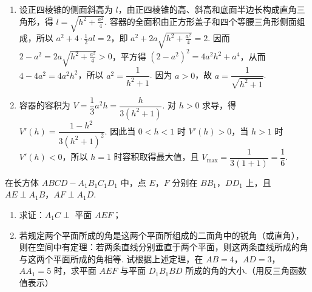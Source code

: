 \begin{solution}
\begin{enumerate}
\item 设正四棱锥的侧面斜高为 \(l\)，由正四棱锥的高、斜高和底面半边长构成直角三角形，得 \(l=\sqrt{h^{2}+\frac{a^{2}}{4}}\). 容器的全面积由正方形盖子和四个等腰三角形侧面组成，所以 \(a^{2}+4\cdot\frac{1}{2}al=2\)，即 \(a^{2}+2a\sqrt{h^{2}+\frac{a^{2}}{4}}=2\). 因而 \(2-a^{2}=2a\sqrt{h^{2}+\frac{a^{2}}{4}}>0\)，平方得 \((2-a^{2})^{2}=4a^{2}h^{2}+a^{4}\)，从而 \(4-4a^{2}=4a^{2}h^{2}\)，所以 \(a^{2}=\dfrac{1}{h^{2}+1}\). 因为 \(a>0\)，故 \(a=\dfrac{1}{\sqrt{h^{2}+1}}\).
\item 容器的容积为 \(V=\dfrac{1}{3}a^{2}h=\dfrac{h}{3(h^{2}+1)}\). 对 \(h>0\) 求导，得 \(V'(h)=\dfrac{1-h^{2}}{3(h^{2}+1)^{2}}\). 因此当 \(0<h<1\) 时 \(V'(h)>0\)，当 \(h>1\) 时 \(V'(h)<0\)，所以 \(h=1\) 时容积取得最大值，且 \(V_{\max}=\dfrac{1}{3(1+1)}=\dfrac{1}{6}\).
\end{enumerate}
\end{solution}

\begin{problem}
在长方体 \(ABCD-A_{1}B_{1}C_{1}D_{1}\) 中，点 \(E\)，\(F\) 分别在 \(BB_{1}\)，\(DD_{1}\) 上，且 \(AE\perp A_{1}B\)，\(AF\perp A_{1}D\).

\begin{enumerate}
\item 求证：\(A_{1}C\perp\) 平面 \(AEF\)；
\item 若规定两个平面所成的角是这两个平面所组成的二面角中的锐角（或直角），则在空间中有定理：若两条直线分别垂直于两个平面，则这两条直线所成的角与这两个平面所成的角相等. 试根据上述定理，在 \(AB=4\)，\(AD=3\)，\(AA_{1}=5\) 时，求平面 \(AEF\) 与平面 \(D_{1}B_{1}BD\) 所成的角的大小.（用反三角函数值表示）
\end{enumerate}

\end{problem}

